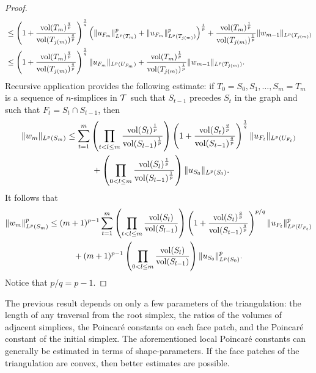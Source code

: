 \documentclass[a4paper]{amsart}
\begin{document}
\begin{proof}
\begin{align*}
    &\leq 
    \left( 1 + \frac{ \operatorname{vol}(T_m)^{\frac q p} }{ \operatorname{vol}(T_{j(m)})^{\frac q p} } \right)^{\frac 1 q}
    \left( 
        \| u_{F_m} \|_{L^{p}(T_m)}^{p}
        +
        \| u_{F_{m}} \|_{L^{p}(T_{j(m)})}^{p}
    \right)^{\frac 1 p}
    +
    \frac{ \operatorname{vol}(T_m)^{\frac 1 p} }{ \operatorname{vol}(T_{j(m)})^{\frac 1 p} }
    \| w_{m-1}\|_{L^{p}(T_{j(m)})}
    \\&\leq 
    \left( 1 + \frac{ \operatorname{vol}(T_m)^{\frac q p} }{ \operatorname{vol}(T_{j(m)})^{\frac q p} } \right)^{\frac 1 q}
    \| u_{F_m} \|_{L^{p}(U_{F_m})} 
    +
    \frac{ \operatorname{vol}(T_m)^{\frac 1 p} }{ \operatorname{vol}(T_{j(m)})^{\frac 1 p} }
    \| w_{m-1}\|_{L^{p}(T_{j(m)})}
    .
 \end{align*}
 Recursive application provides the following estimate:
 if $T_0 = S_0, S_1, \dots, S_m = T_m$ is a sequence of $n$-simplices in ${\mathcal T}$
 such that \color{red}$S_{t-1}$ precedes $S_{t}$ in the graph \color{black} and such that $F_t = S_t \cap S_{t-1}$,
 then 
 \begin{align*}
    \| w_{m} \|_{L^{p}(S_m)}
    &\leq 
    \sum_{t=1}^{m} 
    \left( 
        \prod_{t < l \leq m} 
        \frac{ \operatorname{vol}(S_l)^{\frac 1 p} }{ \operatorname{vol}(S_{l-1})^{\frac 1 p} } 
    \right)
    \left( 1 + \frac{ \operatorname{vol}(S_t)^{\frac q p} }{ \operatorname{vol}(S_{t-1})^{\frac q p} } \right)^{\frac 1 q}
    \| u_{F_t} \|_{L^{p}(U_{F_t})}
    \\&\quad \quad \quad 
    +
    \left( 
        \prod_{0 < l \leq m} 
        \frac{ \operatorname{vol}(S_l)^{\frac 1 p} }{ \operatorname{vol}(S_{l-1})^{\frac 1 p} } 
    \right)
    \| u_{S_0}\|_{L^{p}(S_{0})}
    .
 \end{align*}
 It follows that
 \begin{align*}
    \| w_{m} \|_{L^{p}(S_m)}^{p}
    &\leq 
    (m+1)^{p-1}
    \sum_{t=1}^{m} 
    \left( 
        \prod_{t < l \leq m} 
        \frac{ \operatorname{vol}(S_l) }{ \operatorname{vol}(S_{l-1}) } 
    \right)
    \left( 1 + \frac{ \operatorname{vol}(S_t)^{\frac q p} }{ \operatorname{vol}(S_{t-1})^{\frac q p} } \right)^{p/q}
    \| u_{F_t} \|_{L^{p}(U_{F_t})}^{p}
    \\&\quad \quad \quad 
    +
    (m+1)^{p-1}
    \left( 
        \prod_{0 < l \leq m} 
        \frac{ \operatorname{vol}(S_l) }{ \operatorname{vol}(S_{l-1}) } 
    \right)
    \| u_{S_0}\|_{L^{p}(S_{0})}^{p}
    .
 \end{align*}
 Notice that $p/q = p - 1$.
\end{proof}

\begin{remark}
    The previous result depends on only a few parameters of the triangulation:
    the length of any traversal from the root simplex,
    the ratios of the volumes of adjacent simplices,
    the Poincar\'e constants on each face patch, and the Poincar\'e constant of the initial simplex. 
    The aforementioned local Poincar\'e constants can generally be estimated in terms of shape-parameters. 
    If the face patches of the triangulation are convex, then better estimates are possible. 
\end{remark}
\end{document}
